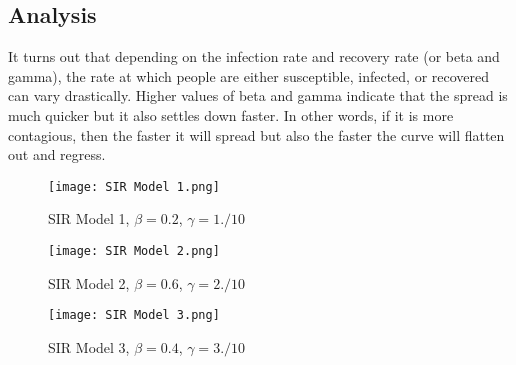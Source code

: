 \documentclass{article}
\begin{document}
\subsection{Analysis}
It turns out that depending on the infection rate and recovery rate (or beta and gamma), the rate at which people are either susceptible, infected, or recovered can vary drastically. Higher values of beta and gamma indicate that the spread is much quicker but it also settles down faster. In other words, if it is more contagious, then the faster it will spread but also the faster the curve will flatten out and regress. 

\begin{figure}[h!]
    \centering
    \texttt{[image: SIR Model 1.png]}
    \caption{SIR Model 1, $\beta=0.2$, $\gamma=1./10$}
    \label{fig:SIR_Model_1}
    
    \centering
    \texttt{[image: SIR Model 2.png]}
    \caption{SIR Model 2, $\beta=0.6$, $\gamma=2./10$}
    \label{fig:SIR_Model_2}
\end{figure}

\newpage

\begin{figure}
    \centering
    \texttt{[image: SIR Model 3.png]}
    \caption{SIR Model 3, $\beta=0.4$, $\gamma=3./10$}
    \label{fig:SIR_Model_3}
\end{figure}
\end{document}
